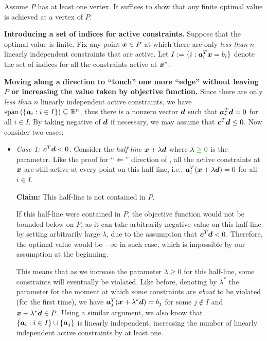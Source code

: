 \begin{enumerate}
\begin{pf}
Assume \(P\) has at least one vertex. It suffices to show that any finite
optimal value is achieved at a vertex of \(P\).

\textbf{Introducing a set of indices for active constraints.} Suppose that the
optimal value is finite. Fix any point \(\bm{x}\in P\) at which there are
only \emph{less than} \(n\) linearly independent constraints that are active.
Let \(I:=\{i:\bm{a}_i^{T}\bm{x}=b_i\}\) denote the set of indices for all
the constraints active at \(\bm{x}^*\).

\textbf{Moving along a direction to ``touch'' one more ``edge'' without leaving
\(P\) or increasing the value taken by objective function.}
Since there are only \emph{less than} \(n\) linearly independent active
constraints, we have \(\operatorname{span}\left(\{\bm{a}_i:i\in I\}\right)\subsetneq\mathbb{R}^n \), thus there
is a nonzero vector \(\bm{d}\) such that \(\bm{a}_i^{T}\bm{d}=0\) for all
\(i\in I\). By taking negative of \(\bm{d}\) if necessary, we may assume that
\(\bm{c}^{T}\bm{d}\le 0\). Now consider two cases:
\begin{itemize}
\item \emph{Case 1: \(\bm{c}^{T}\bm{d}<0\).} Consider the \emph{half-line}
\(\bm{x}+\lambda\bm{d}\) where \(\lambda\gc{\ge 0}\) is the parameter.  Like
the proof for ``\(\Leftarrow\)'' direction of ,
all the active constraints at \(\bm{x}\) are still active at every point on
this half-line, i.e., \(\bm{a}_i^{T}(\bm{x}+\lambda\bm{d})=0\) for all
\(i\in I\).

\textbf{Claim:} This half-line is not contained in \(P\).

\begin{pf}
If this half-line were contained in \(P\), the objective function
would not be bounded below on \(P\), as it can take arbitrarily negative value
on this half-line by setting arbitrarily large \(\lambda\), due to the
assumption that \(\bm{c}^{T}\bm{d}<0\). Therefore, the optimal value would
be \(-\infty\) in such case, which is impossible by our assumption at the beginning.
\end{pf}

This means that as we increase the parameter \(\lambda\ge 0\) for this half-line,
some constraints will eventually be violated. Like before, denoting by
\(\lambda^*\) the parameter for the moment at which some constraints are \emph{about}
to be violated (for the first time), we have
\(\bm{a}_j^{T}(\bm{x}+\lambda^*\bm{d})=b_j\) for some \(j\notin I\) and
\(\bm{x}+\lambda^*\bm{d}\in P\). Using a similar argument, we also know
that \(\{\bm{a}_{i}:i\in I\}\cup\{\bm{a}_j\}\) is linearly independent,
increasing the number of linearly independent active constraints by at least
one.


\end{itemize}
\end{pf}
\end{enumerate}
